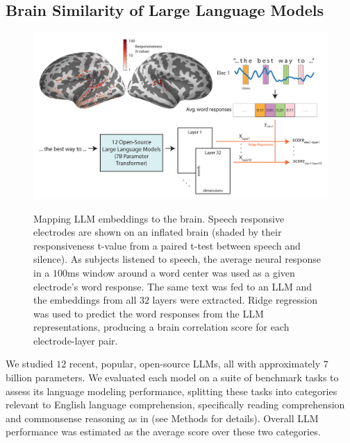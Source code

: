 \subsection{Brain Similarity of Large Language Models}

\begin{figure}[!t]
  \centering
  {\includegraphics[width=0.95\linewidth]{figures/Figure_regression-illustration2-01.png}}
  \caption{Mapping LLM embeddings to the brain. Speech responsive electrodes are shown on an inflated brain (shaded by their responsiveness t-value from a paired t-test between speech and silence). As subjects listened to speech, the average neural response in a $100$ms window around a word center was used as a given electrode's word response. The same text was fed to an LLM and the embeddings from all $32$ layers were extracted. Ridge regression was used to predict the word responses from the LLM representations, producing a brain correlation score for each electrode-layer pair.}      
  \label{fig:1}
\end{figure}

We studied $12$ recent, popular, open-source LLMs, all with approximately $7$ billion parameters. We evaluated each model on a suite of benchmark tasks to assess its language modeling performance, splitting these tasks into categories relevant to English language comprehension, specifically reading comprehension and commonsense reasoning as in \cite{touvron2023llama2} (see Methods for details). Overall LLM performance was estimated as the average score over these two categories.

